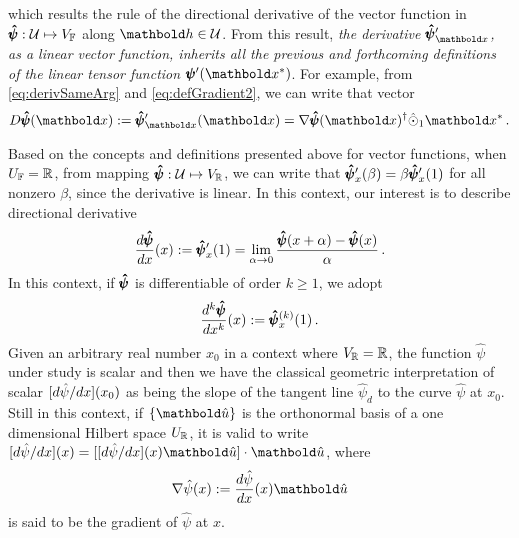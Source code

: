 which results the rule of the directional derivative of the vector function in $\pmb{\hat\psi} : \mathcal{U} \mapsto V_{\mathbb{F}}$ along $\vto{h}\in\mathcal{U}$. From this result, \emph{the derivative $\tnr{\hat\psi}'_{\vto{x}}$, as a linear vector function, inherits all the previous and forthcoming definitions of the linear tensor function $\fua{\tnr{\psi}'}{\vto{x}^*}$}. For example, from \eqref{eq:derivSameArg} and \eqref{eq:defGradient2}, we can write that vector
\begin{equation}\label{eq:derivSameArg2}
\fua{D\tnr{\hat\psi}}{\vto{x}} := \fua{\tnr{\hat\psi}'_{\vto{x}}}{\vto{x}}=\fua{ \nabla\tnr{\hat{\psi}}}{\vto{x}}^\dagger\hat{\odot}_1\vto{x}^*\,.
\end{equation}

Based on the concepts and definitions presented above for vector functions, when $U_{\mathbb{F}}=\mathbb{R}$, from mapping $\pmb{\hat{\psi}} : \mathcal{U} \mapsto V_{\mathbb{R}}$, we can write that $\pmb{\hat{\psi}}'_{x}(\beta) = \beta\pmb{\hat{\psi}}'_{x}(1)$ for all nonzero $\beta$, since the derivative is linear. In this context, our interest is to describe directional derivative  
\begin{equation}\label{eq:derivVecScaFun}
\dfrac{d\pmb{\hat{\psi}}}{dx}(x) := \pmb{\hat{\psi}}'_{x}(1) = \lim_{\alpha\to 0} \dfrac{\pmb{\hat{\psi}}(x+\alpha)-\pmb{\hat{\psi}}(x)}{\alpha}\,. 
\end{equation} 
In this context, if $\pmb{\hat{\psi}}$ is differentiable of order $k\geqslant 1$, we adopt  
\begin{equation}
\dfrac{d^k\pmb{\hat{\psi}}}{dx^k}(x):=\pmb{\hat{\psi}}^{(k)}_{x}(1)\,.
\end{equation} 
Given an arbitrary real number $x_0$ in a context where $V_{\mathbb{R}}=\mathbb{R}$, the function $\hat{\psi}$ under study is scalar and then we have the classical geometric interpretation of scalar $[d{\hat{\psi}}/dx](x_0)$ as being the slope of the tangent line ${\hat{\psi}}_\mathit{d}$ to the curve ${\hat{\psi}}$ at $x_0$. Still in this context, if $\{\vun{u}\}$ is the orthonormal basis of a one dimensional Hilbert space $U_{\mathbb{R}}$, it is valid to write
$\fua{[d{\hat{\psi}}/dx]}{x}=[\fua{[d{\hat{\psi}}/dx]}{x}\vun{u}]\cdot\vun{u}$, where  
\begin{equation}
\nabla\fua{{\hat{\psi}}}{x}:=\fua{\dfrac{d{\hat{\psi}}}{dx}}{x}\vun{u}
\end{equation}
is said to be the gradient of ${\hat{\psi}}$ at $x$.

